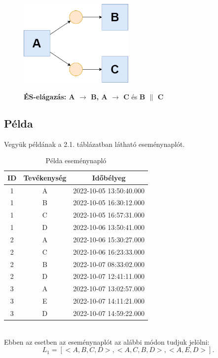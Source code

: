 \vfill

\begin{figure}[h!]
\begin{center}
\includegraphics[width=0.5\textwidth,keepaspectratio=true]{images/img_alpha_and}\\
\caption{\textbf{ÉS-elágazás: A $\rightarrow$ B, A $\rightarrow$ C} és \textbf{B $\parallel$ C}}
\label{fig:example}
\end{center}
\end{figure}

\newpage

\subsection{Példa}
Vegyük példának a 2.1. táblázatban látható eseménynaplót.\\
\begin{table}[h]
\begin{center}
\caption{Példa eseménynapló}
\begin{tabular}{||c | c | c ||}
	\hline
	ID & Tevékenység & Időbélyeg \\ [0.5ex]
	\hline\hline
	1 & A & 2022-10-05 13:50:40.000 \\
	\hline
	1 & B & 2022-10-05 16:30:12.000 \\
	\hline
	1 & C & 2022-10-05 16:57:31.000 \\
	\hline
	1 & D & 2022-10-06 13:50:41.000 \\
	\hline
	2 & A & 2022-10-06 15:30:27.000 \\
	\hline
	2 & C & 2022-10-06 16:23:33.000 \\
	\hline
	2 & B & 2022-10-07 08:33:02.000 \\
	\hline
	2 & D & 2022-10-07 12:41:11.000 \\
	\hline
	3 & A & 2022-10-07 13:02:57.000 \\
	\hline
	3 & E & 2022-10-07 14:11:21.000 \\
	\hline
	3 & D & 2022-10-07 14:59:22.000 \\
	\hline
\end{tabular}
\label{fig:example}
\end{center}
\end{table}\\	
Ebben az esetben az eseménynaplót az alábbi módon tudjuk jelölni:
\[ 
	L_1 = [< A,B,C,D >, <A,C,B,D>, <A,E,D>].
\]

